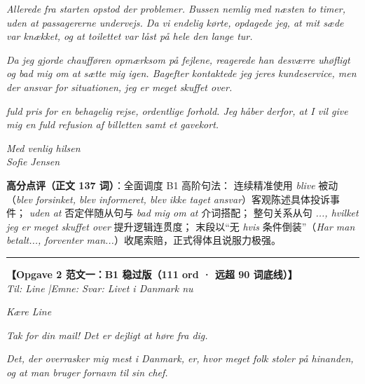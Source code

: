 \begin{answerbox}
\vspace{0.2em}
\textit{Allerede fra starten opstod der problemer. Bussen  nemlig  med næsten to timer, uden at passagererne  undervejs. Da vi endelig kørte, opdagede jeg, at mit sæde var knækket, og at toilettet var låst på hele den lange tur.}

\vspace{0.2em}
\textit{Da jeg gjorde chaufføren opmærksom på fejlene, reagerede han desværre uhøfligt og bad mig om at sætte mig igen. Bagefter kontaktede jeg jeres kundeservice, men der  ansvar for situationen,  jeg er meget skuffet over.}

\vspace{0.2em}
\textit{ fuld pris for en behagelig rejse,  ordentlige forhold. Jeg håber derfor, at I vil give mig en fuld refusion af billetten samt et gavekort.}

\vspace{0.2em}
\textit{Med venlig hilsen\\
Sofie Jensen}

\vspace{0.25em}
\small\textbf{高分点评（正文 137 词）}：全面调度 B1 高阶句法： 连续精准使用 \textit{blive} 被动（\textit{blev forsinket, blev informeret, blev ikke taget ansvar}）客观陈述具体投诉事件； \textit{uden at} 否定伴随从句与 \textit{bad mig om at} 介词搭配； 整句关系从句 \textit{..., hvilket jeg er meget skuffet over} 提升逻辑连贯度； 末段以“无 \textit{hvis} 条件倒装”（\textit{Har man betalt..., forventer man...}）收尾索赔，正式得体且说服力极强。

\vspace{0.45em}
\hrule
\vspace{0.45em}

\textbf{\color{NCDNavy}【Opgave 2 范文一：B1 稳过版（111 ord · 远超 90 词底线）】}\\
\textit{Til: Line \quad|\quad Emne: Svar: Livet i Danmark nu}

\vspace{0.25em}
\textit{Kære Line}

\vspace{0.2em}
\textit{Tak for din mail! Det er dejligt at høre fra dig.}

\vspace{0.2em}
\textit{Det, der overrasker mig mest i Danmark, er, hvor meget folk stoler på hinanden, og at man bruger fornavn til sin chef.}


\end{answerbox}
